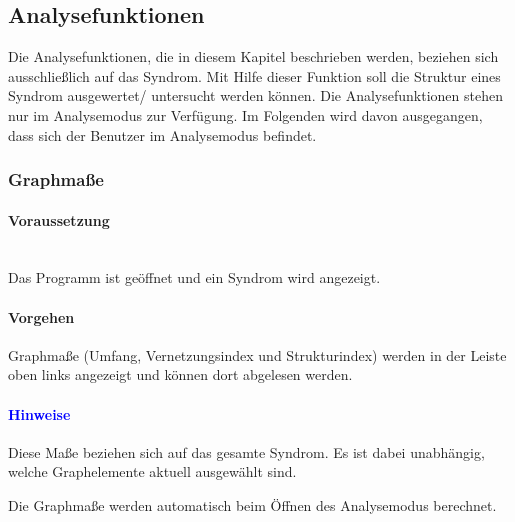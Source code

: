 \documentclass[enabledeprecatedfontcommands,fontsize=11pt,paper=a4,twoside]{scrartcl}
\newcounter{one}
\newcounter{two}[one]
\newcommand*{\hint}{\paragraph{\textcolor{blue}{Hinweise}}}
\newcommand*{\condition}{\paragraph{Voraussetzung}$\;$ \vspace{0.2cm}\\}
\newcommand*{\action}{\paragraph{Vorgehen}}
\let\tempone\itemize
\let\temptwo\enditemize
\renewenvironment{itemize}{\tempone\addtolength{\itemsep}{-10.0pt}}{\temptwo}
\let\origenumerate\enumerate
\let\origendenumerate\endenumerate
\renewenvironment{enumerate}{\origenumerate \addtolength{\itemsep}{-10.0pt}}{\origendenumerate}
\begin{document}
\subsection{Analysefunktionen} \label{analyse}
Die Analysefunktionen, die in diesem Kapitel beschrieben werden, beziehen sich ausschließlich auf das Syndrom. Mit Hilfe dieser Funktion soll die Struktur eines Syndrom ausgewertet/ untersucht werden können. Die Analysefunktionen stehen nur im Analysemodus zur Verfügung. Im Folgenden wird davon ausgegangen, dass sich der Benutzer im Analysemodus befindet.

\begin{figure}[ht!]
	\centering
\end{figure}

\newpage
\subsubsection{Graphmaße} 
	\condition 
	Das Programm ist geöffnet und ein Syndrom wird angezeigt.
	\action
	\begin{enumerate}
		\item Graphmaße (Umfang, Vernetzungsindex und Strukturindex) werden in der Leiste oben links angezeigt und können dort abgelesen werden.
	\end{enumerate} 
	\hint
	\begin{itemize}
		\item Diese Maße beziehen sich auf das gesamte Syndrom. Es ist dabei unabhängig, welche Graphelemente aktuell ausgewählt sind.
		\item Die Graphmaße werden automatisch beim Öffnen des Analysemodus berechnet. \\
	\end{itemize}
\end{document}
